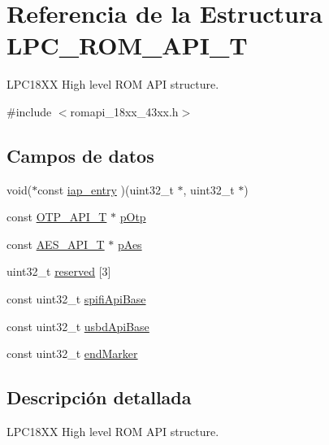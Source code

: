 \hypertarget{struct_l_p_c___r_o_m___a_p_i___t}{}\section{Referencia de la Estructura L\+P\+C\+\_\+\+R\+O\+M\+\_\+\+A\+P\+I\+\_\+T}
\label{struct_l_p_c___r_o_m___a_p_i___t}


L\+P\+C18\+XX High level R\+OM A\+PI structure.  




{\ttfamily \#include $<$romapi\+\_\+18xx\+\_\+43xx.\+h$>$}

\subsection*{Campos de datos}
\begin{DoxyCompactItemize}
\item 
void($\ast$const \hyperlink{struct_l_p_c___r_o_m___a_p_i___t_a219644d0e45fbef2c7223ce8a9973ed0}{iap\+\_\+entry} )(uint32\+\_\+t $\ast$, uint32\+\_\+t $\ast$)
\item 
const \hyperlink{struct_o_t_p___a_p_i___t}{O\+T\+P\+\_\+\+A\+P\+I\+\_\+T} $\ast$ \hyperlink{struct_l_p_c___r_o_m___a_p_i___t_a86471f8c6688aac6e7445731c93f1e56}{p\+Otp}
\item 
const \hyperlink{struct_a_e_s___a_p_i___t}{A\+E\+S\+\_\+\+A\+P\+I\+\_\+T} $\ast$ \hyperlink{struct_l_p_c___r_o_m___a_p_i___t_adeb986ef29cf8092282c1ea911defaa0}{p\+Aes}
\item 
uint32\+\_\+t \hyperlink{struct_l_p_c___r_o_m___a_p_i___t_aa6a7e7637e402ba46cf05af64354b460}{reserved} \mbox{[}3\mbox{]}
\item 
const uint32\+\_\+t \hyperlink{struct_l_p_c___r_o_m___a_p_i___t_a89fd951104ec1dfacddd83e15df96c9b}{spifi\+Api\+Base}
\item 
const uint32\+\_\+t \hyperlink{struct_l_p_c___r_o_m___a_p_i___t_a283da22255e47638afbbb7e8e0cef150}{usbd\+Api\+Base}
\item 
const uint32\+\_\+t \hyperlink{struct_l_p_c___r_o_m___a_p_i___t_a7f34eaacc2cb2f0b7d2ecf6118de8571}{end\+Marker}
\end{DoxyCompactItemize}


\subsection{Descripción detallada}
L\+P\+C18\+XX High level R\+OM A\+PI structure. 

